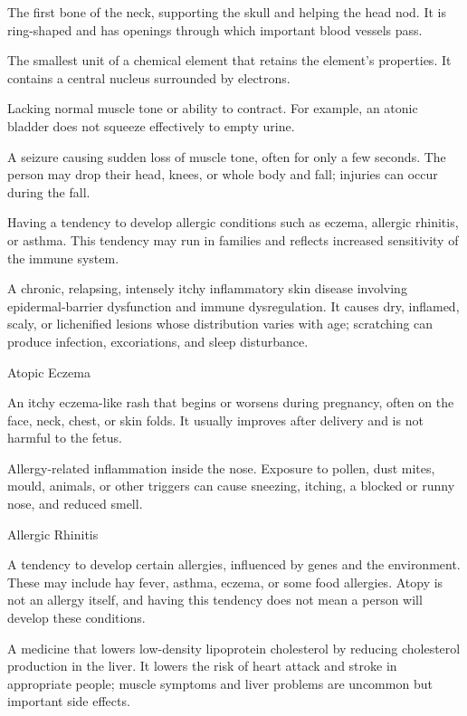  The first bone of the neck, supporting the skull and helping the head nod. It is ring-shaped and has openings through which important blood vessels pass.

 The smallest unit of a chemical element that retains the element’s properties. It contains a central nucleus surrounded by electrons.

 Lacking normal muscle tone or ability to contract. For example, an atonic bladder does not squeeze effectively to empty urine.

 A seizure causing sudden loss of muscle tone, often for only a few seconds. The person may drop their head, knees, or whole body and fall; injuries can occur during the fall.

 Having a tendency to develop allergic conditions such as eczema, allergic rhinitis, or asthma. This tendency may run in families and reflects increased sensitivity of the immune system.

 A chronic, relapsing, intensely itchy inflammatory skin disease involving epidermal-barrier dysfunction and immune dysregulation. It causes dry, inflamed, scaly, or lichenified lesions whose distribution varies with age; scratching can produce infection, excoriations, and sleep disturbance.


\synonyms
Atopic Eczema

 An itchy eczema-like rash that begins or worsens during pregnancy, often on the face, neck, chest, or skin folds. It usually improves after delivery and is not harmful to the fetus.

 Allergy-related inflammation inside the nose. Exposure to pollen, dust mites, mould, animals, or other triggers can cause sneezing, itching, a blocked or runny nose, and reduced smell.

\synonyms
Allergic Rhinitis

 A tendency to develop certain allergies, influenced by genes and the environment. These may include hay fever, asthma, eczema, or some food allergies. Atopy is not an allergy itself, and having this tendency does not mean a person will develop these conditions.

 A medicine that lowers low-density lipoprotein cholesterol by reducing cholesterol production in the liver. It lowers the risk of heart attack and stroke in appropriate people; muscle symptoms and liver problems are uncommon but important side effects.

